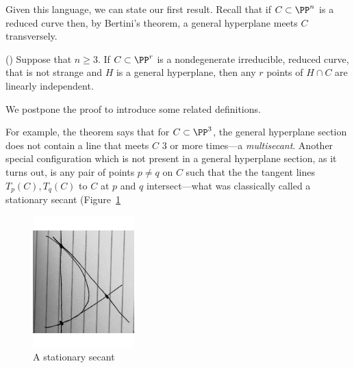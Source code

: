 Given this language, we can state our first result. Recall that if $C\subset \PP^n$ is a reduced curve then, by Bertini's theorem, a general hyperplane meets $C$ transversely.

\begin{theorem} \label{basic linear independence}(\cite[Lemma 1.1]{Rathmann})\label{linear general position}
Suppose that $n\geq 3$. If $C\subset \PP^r$ is a nondegenerate irreducible, reduced curve, that is not strange
and $H$ is a general hyperplane, then any $r$ points of $H\cap C$ are
linearly independent.
\end{theorem}

We postpone the proof to introduce some related definitions.

For example, the theorem says that for $C \subset \PP^3$, the general hyperplane section does not contain a line
that meets $C$ 3 or more times---a \emph{multisecant}. Another special configuration which is not present in a general hyperplane section, as it turns out,
is any pair of points $p\neq q$ on $C$ such that the the tangent lines $T_p(C), T_q(C)$ to $C$ at $p$ and $q$ intersect---what was classically
called a stationary secant (Figure~\ref{Fig9A}


\begin{figure}
\begin{center}
\centerline {\includegraphics[height=2in]{"Fig9A.pdf"}}
\caption{A stationary secant}
\label{Fig9A}
\end{center}
\end{figure}


